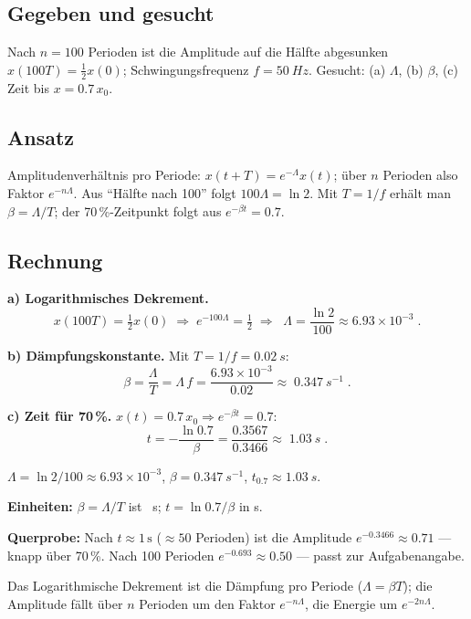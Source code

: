 
\subsection*{Gegeben und gesucht}
Nach $n=100$ Perioden ist die Amplitude auf die Hälfte abgesunken
$x(100T)=\tfrac12 x(0)$; Schwingungsfrequenz $f=\qty{50}{Hz}$.
Gesucht: (a) $\Lambda$, (b) $\beta$, (c) Zeit bis $x=0.7\,x_0$.

\subsection*{Ansatz}
Amplitudenverhältnis pro Periode: $x(t+T)=e^{-\Lambda}x(t)$; über $n$ Perioden
also Faktor $e^{-n\Lambda}$. Aus ``Hälfte nach 100'' folgt $100\Lambda=\ln 2$.
Mit $T=1/f$ erhält man $\beta=\Lambda/T$; der 70\,\%-Zeitpunkt folgt aus
$e^{-\beta t}=0.7$.

\subsection*{Rechnung}
\textbf{a) Logarithmisches Dekrement.}
\begin{equation}
  x(100T)=\tfrac12 x(0)
  \;\Rightarrow\;
  e^{-100\Lambda}=\tfrac12
  \;\Rightarrow\;
  \boxed{\;\Lambda=\frac{\ln 2}{100}\approx6.93\times10^{-3}\;}.
\end{equation}

\textbf{b) Dämpfungskonstante.} Mit $T=1/f=\qty{0.02}{s}$:
\begin{equation}
  \beta=\frac{\Lambda}{T}=\Lambda\, f
  =\frac{6.93\times10^{-3}}{0.02}
  \approx \boxed{\;\qty{0.347}{s^{-1}}\;}.
\end{equation}

\textbf{c) Zeit für 70\,\%.} $x(t)=0.7\,x_0\Rightarrow e^{-\beta t}=0.7$:
\begin{equation}
  t=-\frac{\ln 0.7}{\beta}
  =\frac{0.3567}{0.3466}
  \approx\boxed{\;\qty{1.03}{s}\;}.
\end{equation}

\begin{ergebnis}
$\Lambda=\ln2/100\approx6.93\times10^{-3}$, $\beta=\qty{0.347}{s^{-1}}$,
$t_{0.7}\approx\qty{1.03}{s}$.
\end{ergebnis}

\begin{kontrolle}
\textbf{Einheiten:} $\beta=\Lambda/T$ ist \unit{\per\second}; $t=\ln 0.7/\beta$
in \unit{\second}. \checkmark

\textbf{Querprobe:} Nach $t\approx1\,\mathrm s$ ($\approx50$ Perioden) ist die
Amplitude $e^{-0.3466}\approx0.71$ --- knapp über 70\,\%. Nach 100 Perioden
$e^{-0.693}\approx0.50$ --- passt zur Aufgabenangabe. \checkmark
\end{kontrolle}

\begin{merksatz}
Das Logarithmische Dekrement ist die Dämpfung pro Periode ($\Lambda=\beta T$);
die Amplitude fällt über $n$ Perioden um den Faktor $e^{-n\Lambda}$, die
Energie um $e^{-2n\Lambda}$.
\end{merksatz}
